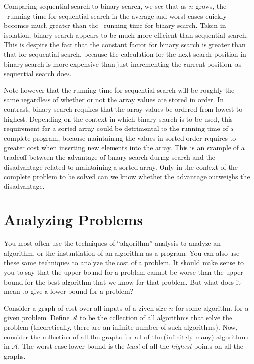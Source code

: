 Comparing sequential search to binary search, we see that as \(n\)
grows, the \Thetan\ running time for sequential search in the
average and worst cases quickly becomes much greater than the
\Thetalogn\ running time for binary search.
Taken in isolation, binary search appears to be much more
efficient than sequential search.
This is despite the fact that the constant factor for binary search is 
greater than that for sequential search, because the calculation for
the next search position in binary search is more expensive than just
incrementing the current position, as sequential search does.

Note however that the running time for sequential search will be
roughly the same regardless of whether or not the array values are
stored in order.
In contrast, binary search requires that the array values be ordered
from lowest to highest.
Depending on the context in which binary search is to be used, this
requirement for a sorted array could be detrimental to the running
time of a complete program, because  maintaining the values in sorted
order requires to greater cost when inserting new elements into the
array.
This is an example of a tradeoff between the
advantage of binary search during search and the disadvantage related
to maintaining a sorted array.
Only in the context of the complete problem to be solved can we know
whether the advantage outweighs the disadvantage.

\newpage

\section{Analyzing Problems}
\label{ProbAnal}

You most often use the techniques of ``algorithm'' analysis to analyze
an algorithm, or the instantiation of an algorithm as a program.
You can also use these same techniques to analyze the cost of a
problem.
It should make sense to you to say that the upper bound for a problem
cannot be worse than the upper bound for the best algorithm that we
know for that problem.
But what does it mean to give a lower bound for a problem?

Consider a graph of cost over all inputs of a given size \(n\) for
some algorithm for a given problem.
Define \(\mathcal{A}\) to be the collection of all algorithms that
solve the problem (theoretically, there are an infinite number of such
algorithms).
Now, consider the collection of all the graphs for all of the
(infinitely many) algorithms in \(\mathcal{A}\).
The worst case lower bound is the \emph{least} of all the
\emph{highest} points on all the graphs.

